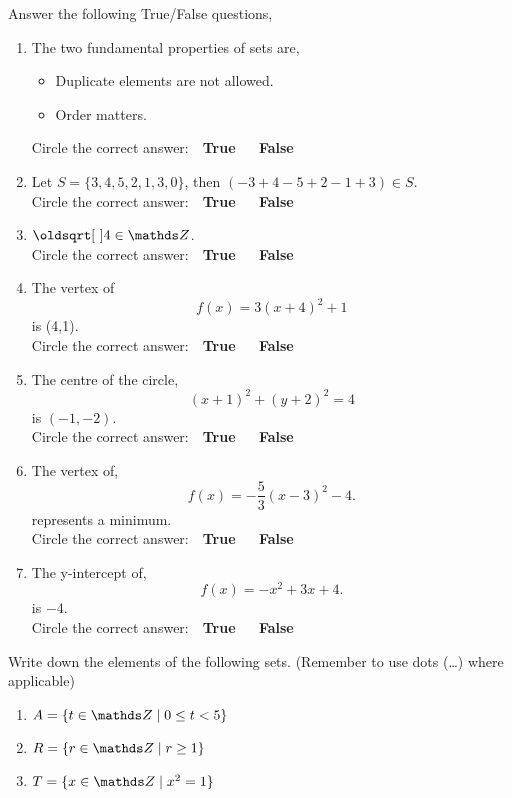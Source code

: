 \documentclass[12pt]{article} %
\begin{document}
\begin{qstn}[1] %
  Answer the following True/False questions,
  \begin{enumerate}
    \item The two fundamental properties of sets are,
      \begin{itemize}
        \item Duplicate elements are not allowed.
        \item Order matters.
      \end{itemize}
      Circle the correct answer: \,\, \textbf{True} \,\,\,\,\,\, \textbf{False}

    \item Let $S = \{3,4,5,2,1,3,0\} $, then $(-3+4-5+2-1+3) \in S$.\\
      Circle the correct answer: \,\, \textbf{True} \,\,\,\,\,\, \textbf{False}

    \item $\sqrt{4} \in \Z$.\\
      Circle the correct answer: \,\, \textbf{True} \,\,\,\,\,\, \textbf{False}

    \item The vertex of 
      \[
        f(x) = 3\left( x + 4 \right)^2 + 1 
      \] is (4,1).\\ 
      Circle the correct answer: \,\, \textbf{True} \,\,\,\,\,\, \textbf{False}

    \item The centre of the circle,
      \[
            (x+1)^2 + (y +2)^2 = 4
      \] is $(-1,-2)$.\\
      Circle the correct answer: \,\, \textbf{True} \,\,\,\,\,\, \textbf{False}

    \item The vertex of,
      \[
            f(x) = -\frac{5}{3}\left( x - 3 \right)^2 - 4
      .\] represents a minimum.\\
      Circle the correct answer: \,\, \textbf{True} \,\,\,\,\,\, \textbf{False}
    \item The y-intercept of,
      \[
              f(x) = -x^2 + 3x + 4
      .\] is $-4$.\\
      Circle the correct answer: \,\, \textbf{True} \,\,\,\,\,\, \textbf{False}
  \end{enumerate}
\end{qstn}



\begin{qstn}[2]
  Write down the elements of the following sets. (Remember to use dots (\dots) where applicable)
  \begin{enumerate}[label=(\alph*)]
    \item $A = \{t\in \Z \mid 0 \leq  t < 5\} $ 
      \vspace*{4cm}

    \item $R = \{r \in \Z \mid r \geq 1\} $ 
      \vspace*{4cm}

    \item $T = \{x \in \Z \mid x^2 = 1\} $
  \end{enumerate}
\end{qstn}
\end{document}

